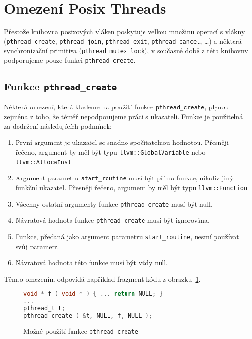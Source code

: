 \documentclass{fithesis2}
\begin{document}
\section{Omezení Posix Threads}
Přestože knihovna posixových vláken poskytuje velkou množinu operací s vlákny (\texttt{pthread\_create}, \texttt{pthread\_join}, \texttt{pthread\_exit}, \texttt{pthread\_cancel}, \ldots) a některá synchronizační primitiva (\texttt{pthread\_mutex\_lock}), v současné době z této knihovny podporujeme pouze funkci \texttt{pthread\_create}.

\subsection{Funkce \texttt{pthread\_create}}
Některá omezení, která klademe na použití funkce \texttt{pthread\_create}, plynou zejména z toho, že téměř nepodporujeme práci s ukazateli. Funkce je použitelná za dodržení následujících podmínek:

\begin{enumerate}
\item První argument je ukazatel se snadno spočitatelnou hodnotou. Přesněji řečeno, argument by měl být typu \texttt{llvm::GlobalVariable} nebo \texttt{llvm::AllocaInst}.
\item Argument parametru \texttt{start\_routine} musí být přímo funkce, nikoliv jiný funkční ukazatel. Přesněji řečeno, argument by měl být typu \texttt{llvm::Function}
\item Všechny ostatní argumenty funkce \texttt{pthread\_create} musí být null.
\item Návratová hodnota funkce \texttt{pthread\_create} musí být ignorována.
\item Funkce, předaná jako argument parametru \texttt{start\_routine}, nesmí používat svůj parametr.
\item Návratová hodnota této funkce musí být vždy null.
\end{enumerate}

Těmto omezením odpovídá například fragment kódu z obrázku~\ref{fig:pthread-create-usage-c}.
\begin{figure}[h!]
\begin{lstlisting}[language=C]
void * f ( void * ) { ... return NULL; }
...
pthread_t t;
pthread_create ( &t, NULL, f, NULL );
\end{lstlisting}
\caption{Možné použití funkce \texttt{pthread\_create}}
\label{fig:pthread-create-usage-c}
\end{figure}
\end{document}

